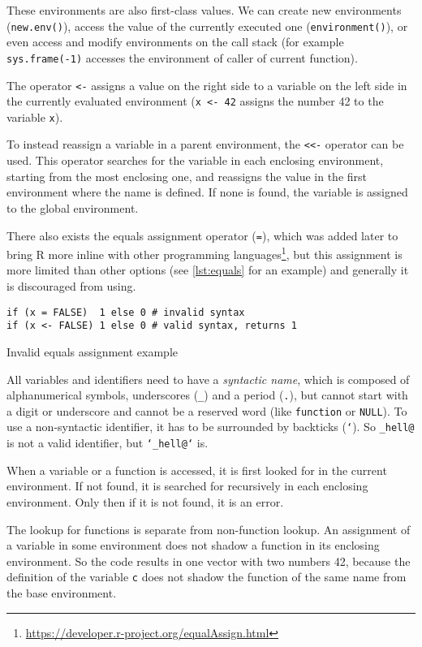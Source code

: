 These environments are also first-class values. We can create new environments (\texttt{new.env()}), access the value of the currently executed one (\texttt{environment()}), or even access and modify environments on the call stack (for example \texttt{sys.frame(-1)} accesses the environment of caller of current function).

The operator \texttt{<-} assigns a value on the right side to a variable on the left side in the currently evaluated environment (\texttt{x <- 42} assigns the number 42 to the variable \texttt{x}).

To instead reassign a variable in a parent environment, the \texttt{<<-} operator can be used. This operator searches for the variable in each enclosing environment, starting from the most enclosing one, and reassigns the value in the first environment where the name is defined. If none is found, the variable is assigned to the global environment.

There also exists the equals assignment operator (\texttt{=}), which was added later to bring R more inline with other programming languages\footnote{\url{https://developer.r-project.org/equalAssign.html}}, but this assignment is more limited than other options (see \ref{lst:equals} for an example) and generally it is discouraged from using.

\begin{listing}[h!]
	\centering
	\begin{verbatim}
if (x = FALSE)  1 else 0 # invalid syntax
if (x <- FALSE) 1 else 0 # valid syntax, returns 1
    \end{verbatim}
	\caption{Invalid equals assignment example}\label{lst:equals}
\end{listing}

All variables and identifiers need to have a \textit{syntactic name}, which is composed of alphanumerical symbols, underscores (\texttt{\_}) and a period (\texttt{.}), but cannot start with a digit or underscore and cannot be a reserved word (like \texttt{function} or \texttt{NULL}). To use a non-syntactic identifier, it has to be surrounded by backticks (\texttt{`}). So \texttt{\_hell@} is not a valid identifier, but \texttt{`\_hell@`} is.

When a variable or a function is accessed, it is first looked for in the current environment. If not found, it is searched for recursively in each enclosing environment. Only then if it is not found, it is an error.

The lookup for functions is separate from non-function lookup. An assignment of a variable in some environment does not shadow a function in its enclosing environment.
So the code
results in one vector with two numbers 42, because the definition of the variable \texttt{c} does not shadow the function of the same name from the base environment.

